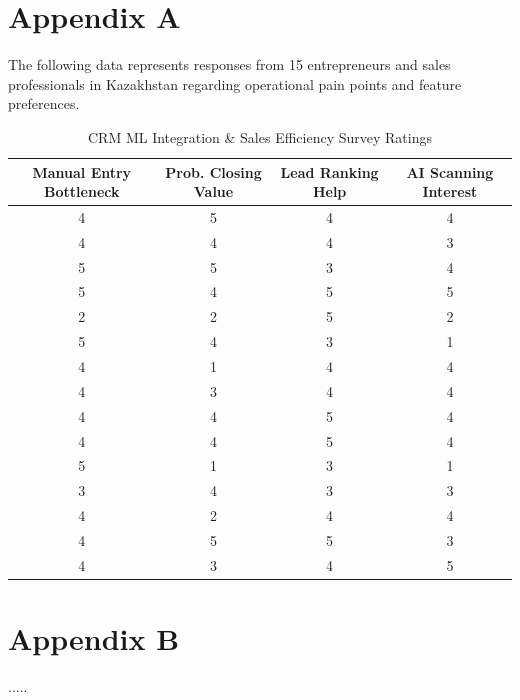 %
%
\chapter{Appendix A}
The following data represents responses from 15 entrepreneurs and sales professionals in Kazakhstan regarding operational pain points and feature preferences.

\begin{center}
\begin{table}[h]
\captionsetup{belowskip=-25pt}  %
\small
\centering
    \begin{tabular}{|cccc|}
    Manual Entry Bottleneck & Prob. Closing Value & Lead Ranking Help & AI Scanning Interest \\
    \hline
        4 & 5 & 4 & 4 \\
        4 & 4 & 4 & 3 \\
        5 & 5 & 3 & 4 \\
        5 & 4 & 5 & 5 \\
        2 & 2 & 5 & 2 \\
        5 & 4 & 3 & 1 \\
        4 & 1 & 4 & 4 \\
        4 & 3 & 4 & 4 \\
        4 & 4 & 5 & 4 \\
        4 & 4 & 5 & 4 \\
        5 & 1 & 3 & 1 \\
        3 & 4 & 3 & 3 \\
        4 & 2 & 4 & 4 \\
        4 & 5 & 5 & 3 \\
        4 & 3 & 4 & 5 \\
    \end{tabular}
\caption{CRM ML Integration \& Sales Efficiency Survey Ratings}
\label{tab:1}
\end{table}
\end{center}
%

\chapter{Appendix B }

.....